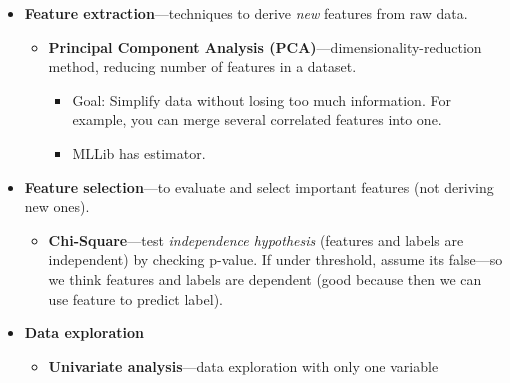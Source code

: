 \begin{itemize}
\begin{itemize}
\begin{itemize}
\begin{itemize}
        \begin{itemize}
                \item
          It\textquotesingle s a blackbox representation, so
          representation rule isn\textquotesingle t deterministic, but
          has superior performance in many NLP tasks.
        \item
          Using w2v, a neural net will be trained on the dataset.
        \item
          MLLib provides estimator for this (fit then transform).
        \end{itemize}
      \end{itemize}
    \end{itemize}
  \end{itemize}
\item
  \textbf{Feature extraction}---techniques to derive \emph{new} features
  from raw data.

  \begin{itemize}
    \item
    \textbf{Principal Component Analysis
    (PCA)}---dimensionality-reduction method, reducing number of
    features in a dataset.

    \begin{itemize}
        \item
      Goal: Simplify data without losing too much information. For
      example, you can merge several correlated features into one.
    \item
      MLLib has estimator.
    \end{itemize}
  \end{itemize}
\item
  \textbf{Feature selection}---to evaluate and select important features
  (not deriving new ones).

  \begin{itemize}
    \item
    \textbf{Chi-Square}---test \emph{independence hypothesis} (features
    and labels are independent) by checking p-value. If under threshold,
    assume it\textquotesingle s false---so we think features and labels
    are dependent (good because then we can use feature to predict
    label).
  \end{itemize}
\item
  \textbf{Data exploration}

  \begin{itemize}
    \item
    \textbf{Univariate analysis}---data exploration with only one
    variable


\end{itemize}
\end{itemize}
